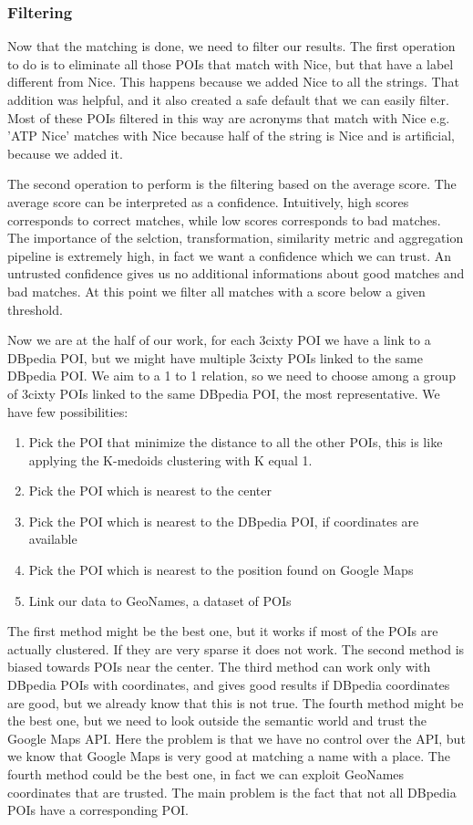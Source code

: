 \documentclass[paper=a4, fontsize=11pt]{scrartcl}
\begin{document}
\subsubsection{Filtering}
Now that the matching is done, we need to filter our results.
The first operation to do is to eliminate all those POIs that match with Nice, but that have a label different from Nice. This happens because we added Nice to all the strings. That addition was helpful, and it also created a safe default that we can easily filter.
Most of these POIs filtered in this way are acronyms that match with Nice e.g. 'ATP Nice' matches with Nice because half of the string is Nice and is artificial, because we added it.

The second operation to perform is the filtering based on the average score.
The average score can be interpreted as a confidence. Intuitively, high scores corresponds to correct matches, while low scores corresponds to bad matches.
The importance of the selction, transformation, similarity metric and aggregation pipeline is extremely high, in fact we want a confidence which we can trust. An untrusted confidence gives us no additional informations about good matches and bad matches.
At this point we filter all matches with a score below a given threshold.

Now we are at the half of our work, for each 3cixty POI we have a link to a DBpedia POI, but we might have multiple 3cixty POIs linked to the same DBpedia POI. We aim to a 1 to 1 relation, so we need to choose among a group of 3cixty POIs linked to the same DBpedia POI, the most representative.
We have few possibilities:
\begin{enumerate}
\item Pick the POI that minimize the distance to all the other POIs, this is like applying the K-medoids clustering with K equal 1.
\item Pick the POI which is nearest to the center
\item Pick the POI which is nearest to the DBpedia POI, if coordinates are available
\item Pick the POI which is nearest to the position found on Google Maps
\item Link our data to GeoNames, a dataset of POIs
\end{enumerate}
The first method might be the best one, but it works if most of the POIs are actually clustered. If they are very sparse it does not work.
The second method is biased towards POIs near the center.
The third method can work only with DBpedia POIs with coordinates, and gives good results if DBpedia coordinates are good, but we already know that this is not true.
The fourth method might be the best one, but we need to look outside the semantic world and trust the Google Maps API. Here the problem is that we have no control over the API, but we  know that Google Maps is very good at matching a name with a place.
The fourth method could be the best one, in fact we can exploit GeoNames coordinates that are trusted. The main problem is the fact that not all DBpedia POIs have a corresponding POI.
\end{document}
